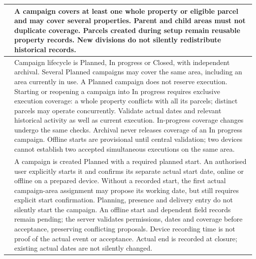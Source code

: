 {\begin{longtable}{L{0.12}L{0.88}}
\midrule
{}\label{br:007}\textbf{} & A campaign covers at least one whole property or eligible parcel and may cover several properties. Parent and child areas must not duplicate coverage. Parcels created during setup remain reusable property records. New divisions do not silently redistribute historical records. \\
\midrule
{}\label{br:008}\textbf{} & Campaign lifecycle is Planned, In progress or Closed, with independent archival. Several Planned campaigns may cover the same area, including an area currently in use. A Planned campaign does not reserve execution. Starting or reopening a campaign into In progress requires exclusive execution coverage: a whole property conflicts with all its parcels; distinct parcels may operate concurrently. Validate actual dates and relevant historical activity as well as current execution. In-progress coverage changes undergo the same checks. Archival never releases coverage of an In progress campaign. Offline starts are provisional until central validation; two devices cannot establish two accepted simultaneous executions on the same area. \\

\midrule
{}\label{br:009}\textbf{} & A campaign is created Planned with a required planned start. An authorised user explicitly starts it and confirms its separate actual start date, online or offline on a prepared device. Without a recorded start, the first actual campaign-area assignment may propose its working date, but still requires explicit start confirmation. Planning, presence and delivery entry do not silently start the campaign. An offline start and dependent field records remain pending; the server validates permissions, dates and coverage before acceptance, preserving conflicting proposals. Device recording time is not proof of the actual event or acceptance. Actual end is recorded at closure; existing actual dates are not silently changed. \\


\end{longtable}}
